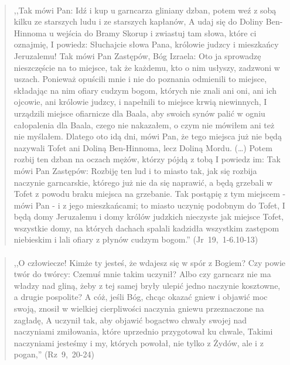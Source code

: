 \documentclass[10pt,a4paper,oneside]{article}
\begin{document}
\paragraph{}
\begin{quote}
,,Tak mówi Pan: Idź i kup u garncarza gliniany dzban, potem weź z sobą kilku ze starszych ludu i ze starszych kapłanów, A udaj się do Doliny Ben-Hinnoma u wejścia do Bramy Skorup i zwiastuj tam słowa, które ci oznajmię, I powiedz: Słuchajcie słowa Pana, królowie judzcy i mieszkańcy Jeruzalemu! Tak mówi Pan Zastępów, Bóg Izraela: Oto ja sprowadzę nieszczęście na to miejsce, tak że każdemu, kto o nim usłyszy, zadzwoni w uszach. Ponieważ opuścili mnie i nie do poznania odmienili to miejsce, składając na nim ofiary cudzym bogom, których nie znali ani oni, ani ich ojcowie, ani królowie judzcy, i napełnili to miejsce krwią niewinnych, I urządzili miejsce ofiarnicze dla Baala, aby swoich synów palić w ogniu całopalenia dla Baala, czego nie nakazałem, o czym nie mówiłem ani też nie myślałem. Dlatego oto idą dni, mówi Pan, że tego miejsca już nie będą nazywali Tofet ani Doliną Ben-Hinnoma, lecz Doliną Mordu. (\ldots) Potem rozbij ten dzban na oczach mężów, którzy pójdą z tobą I powiedz im: Tak mówi Pan Zastępów: Rozbiję ten lud i to miasto tak, jak się rozbija naczynie garncarskie, którego już nie da się naprawić, a będą grzebali w Tofet z powodu braku miejsca na grzebanie. Tak postąpię z tym miejscem - mówi Pan - i z jego mieszkańcami; to miasto uczynię podobnym do Tofet, I będą domy Jeruzalemu i domy królów judzkich nieczyste jak miejsce Tofet, wszystkie domy, na których dachach spalali kadzidła wszystkim zastępom niebieskim i lali ofiary z płynów cudzym bogom.'' \mbox{(Jr 19, 1-6.10-13)}
\end{quote}
\paragraph{}
\begin{quote}
,,O człowiecze! Kimże ty jesteś, że wdajesz się w spór z Bogiem? Czy powie twór do twórcy: Czemuś mnie takim uczynił? Albo czy garncarz nie ma władzy nad gliną, żeby z tej samej bryły ulepić jedno naczynie kosztowne, a drugie pospolite? A cóż, jeśli Bóg, chcąc okazać gniew i objawić moc swoją, znosił w wielkiej cierpliwości naczynia gniewu przeznaczone na zagładę, A uczynił tak, aby objawić bogactwo chwały swojej nad naczyniami zmiłowania, które uprzednio przygotował ku chwale, Takimi naczyniami jesteśmy i my, których powołał, nie tylko z Żydów, ale i z pogan,'' \mbox{(Rz 9, 20-24)}
\end{quote}
\end{document}
